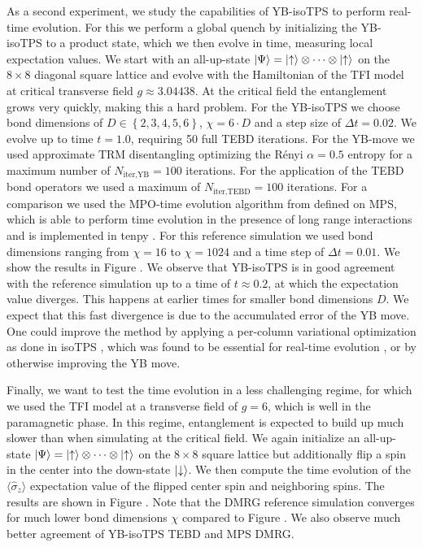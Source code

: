 As a second experiment, we study the capabilities of YB-isoTPS to perform real-time evolution. For this we perform a global quench by initializing the YB-isoTPS to a product state, which we then evolve in time, measuring local expectation values. We start with an all-up-state $\ket{\Psi} = \ket{\uparrow}\otimes\cdots\otimes\ket{\uparrow}$ on the $8\times8$ diagonal square lattice and evolve with the Hamiltonian of the TFI model at critical transverse field $g \approx 3.04438$. At the critical field the entanglement grows very quickly, making this a hard problem. For the YB-isoTPS we choose bond dimensions of $D\in\left\{2, 3, 4, 5, 6\right\}$, $\chi = 6\cdot D$ and a step size of $\Delta t = 0.02$. We evolve up to time $t = 1.0$, requiring 50 full TEBD iterations. For the YB-move we used approximate TRM disentangling optimizing the Rényi $\alpha = 0.5$ entropy for a maximum number of $N_\text{iter,YB} = 100$ iterations. For the application of the TEBD bond operators we used a maximum of $N_\text{iter,TEBD} = 100$ iterations. For a comparison we used the MPO-time evolution algorithm from \cite{cite:time_evolving_a_mps_with_long_range_interactions} defined on MPS, which is able to perform time evolution in the presence of long range interactions and is implemented in tenpy \cite{cite:tenpy}. For this reference simulation we used bond dimensions ranging from $\chi = 16$ to $\chi= 1024$ and a time step of $\Delta t = 0.01$. We show the results in Figure . We observe that YB-isoTPS is in good agreement with the reference simulation up to a time of $t\approx0.2$, at which the expectation value diverges. This happens at earlier times for smaller bond dimensions $D$. We expect that this fast divergence is due to the accumulated error of the YB move. One could improve the method by applying a per-column variational optimization as done in isoTPS \cite{cite:isometric_tensor_network_states_in_two_dimensions, cite:efficient_simulation_of_dynamics_in_two_dimensional_quantum_spin_systems}, which was found to be essential for real-time evolution \cite{cite:efficient_simulation_of_dynamics_in_two_dimensional_quantum_spin_systems}, or by otherwise improving the YB move. \par


Finally, we want to test the time evolution in a less challenging regime, for which we used the TFI model at a transverse field of $g = 6$, which is well in the paramagnetic phase. In this regime, entanglement is expected to build up much slower than when simulating at the critical field. We again initialize an all-up-state $\ket{\Psi} = \ket{\uparrow}\otimes\cdots\otimes\ket{\uparrow}$ on the $8\times8$ square lattice but additionally flip a spin in the center into the down-state $\ket{\downarrow}$. We then compute the time evolution of the $\langle\hat{\sigma}_z\rangle$ expectation value of the flipped center spin and neighboring spins. The results are shown in Figure . Note that the DMRG reference simulation converges for much lower bond dimensions $\chi$ compared to Figure . We also observe much better agreement of YB-isoTPS TEBD and MPS DMRG.